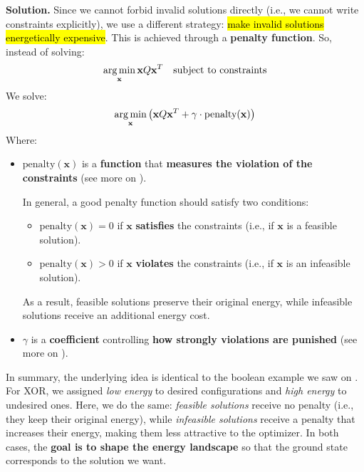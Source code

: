 \highspace
\textcolor{Green3}{ \textbf{Solution.}} Since we cannot forbid invalid solutions directly (i.e., we cannot write constraints explicitly), we use a different strategy: \hl{make invalid solutions energetically expensive}. This is achieved through a \textbf{penalty function}. So, instead of solving:
\begin{equation*}
    \operatorname*{arg\,min}_{\mathbf{x}} \mathbf{x} Q \mathbf{x}^T \quad \text{subject to constraints}
\end{equation*}
We solve:
\begin{equation}
    \operatorname*{arg\,min}_{\mathbf{x}} \left( \mathbf{x} Q \mathbf{x}^T + \gamma \cdot \text{penalty}(\mathbf{x}) \right)
\end{equation}
Where:
\begin{itemize}
    \item $\text{penalty}(\mathbf{x})$ is a \textbf{function} that \textbf{measures the violation of the constraints} (see more on ).

    In general, a good penalty function should satisfy two conditions:
    \begin{itemize}
        \item[\textcolor{Green3}{\faIcon{check}}] $\text{penalty}(\mathbf{x}) = 0$ if $\mathbf{x}$ \textbf{satisfies} the constraints (i.e., if $\mathbf{x}$ is a feasible solution).
        \item[\textcolor{Red2}{\faIcon{times}}] $\text{penalty}(\mathbf{x}) > 0$ if $\mathbf{x}$ \textbf{violates} the constraints (i.e., if $\mathbf{x}$ is an infeasible solution).
    \end{itemize}
    As a result, feasible solutions preserve their original energy, while infeasible solutions receive an additional energy cost.
    
    
    \item $\gamma$ is a \textbf{coefficient} controlling \textbf{how strongly violations are punished} (see more on ).
\end{itemize}
In summary, the underlying idea is identical to the boolean example we saw on . For XOR, we assigned \emph{low energy} to desired configurations and \emph{high energy} to undesired ones. Here, we do the same: \emph{feasible solutions} receive no penalty (i.e., they keep their original energy), while \emph{infeasible solutions} receive a penalty that increases their energy, making them less attractive to the optimizer. In both cases, the \textbf{goal is to shape the energy landscape} so that the ground state corresponds to the solution we want.

